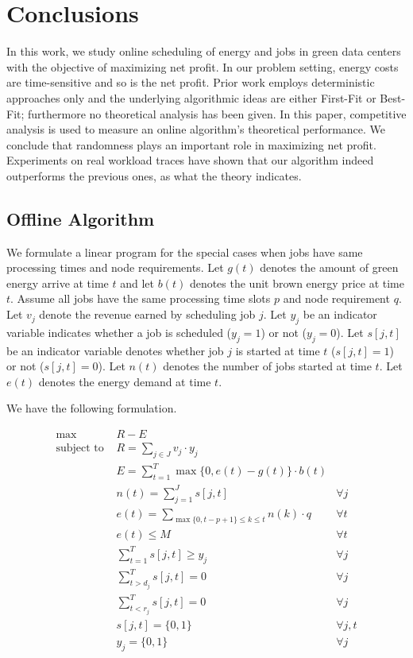 \documentclass[conference]{IEEEtran}
\begin{document}
\section{Conclusions}

In this work, we study online scheduling of energy and jobs in green data centers with the objective of maximizing net profit. In our problem setting, energy costs are time-sensitive and so is the net profit. Prior work employs deterministic approaches only and the underlying algorithmic ideas are either First-Fit or Best-Fit; furthermore no theoretical analysis has been given. In this paper, competitive analysis is used to measure an online algorithm's theoretical performance. We conclude that randomness plays an important role in maximizing net profit. Experiments on real workload traces have shown that our algorithm indeed outperforms the previous ones, as what the theory indicates.








\appendix
\renewcommand{\thesubsection}{\Alph{subsection}}



\subsection{Offline Algorithm}
\label{Appendix_offline}
We formulate a linear program for the special cases when jobs have same processing times and node requirements. Let $g(t)$ denotes the amount of green energy arrive at time $t$ and let $b(t)$ denotes the unit brown energy price at time $t$. Assume all jobs have the same processing time slots $p$ and node requirement $q$. Let $v_j$ denote the revenue earned by scheduling job $j$. Let $y_j$ be an indicator variable indicates whether a job is scheduled ($y_j = 1$) or not ($y_j = 0$). Let $s[j, t]$ be an indicator variable denotes whether job $j$ is started at time $t$ ($s[j, t]=1$) or not ($s[j, t] = 0$). Let $n(t)$ denotes the number of jobs started at time $t$. Let $e(t)$ denotes the energy demand at time $t$.

We have the following formulation.

\begin{align*}
\max & R - E &\\
\mbox{subject to } & R = \sum_{j \in J} v_j \cdot y_j &\\
& E = \sum^T_{t = 1} \max\{0, e(t) - g(t)\} \cdot b(t) &\\
& n(t) = \sum^J_{j = 1} s[j, t] & \forall j\\
& e(t) = \sum_{\max\{0, t - p + 1\} \le k \le t} n(k) \cdot q  & \forall t\\
& e(t) \le M & \forall t\\
& \sum^T_{t = 1} s[j, t] \ge y_j & \forall j\\
& \sum^T_{t > d_j} s[j, t] = 0 & \forall j\\
& \sum^T_{t < r_j} s[j, t] = 0 & \forall j\\
& s[j, t] = \{0, 1\} & \forall j, t\\
& y_j = \{0, 1\} & \forall j
\end{align*}
\end{document}
